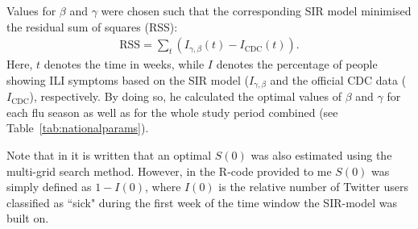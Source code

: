 \documentclass[11pt, a4paper,twoside]{report}\usepackage[]{graphicx}\usepackage[]{color}
\begin{document}
Values for $\beta$ and $\gamma$ were chosen such that the corresponding SIR model minimised the residual sum of squares (RSS):
  \begin{align}
\text{RSS} = \sum_{t}(I_{\gamma, \beta}(t)-I_{\text{CDC}}(t)). \label{eq:1}
  \end{align}
Here, $t$ denotes the time in weeks, while $I$ denotes the percentage of people showing ILI symptoms based on the SIR model ($I_{\gamma, \beta}$ and the official CDC data ($I_{\text{CDC}}$), respectively. By doing so, he calculated the optimal values of $\beta$ and $\gamma$ for each flu season as well as for the whole study period combined (see Table~\ref{tab:nationalparams}). 

Note that in \cite{bodnar_data_2015} it is written that an optimal $S(0)$ was also estimated using the multi-grid search method. However, in the R-code provided to me $S(0)$ was simply defined as $1-I(0)$, where $I(0)$ is the relative number of Twitter users classified as ``sick" during the first week of the time window the SIR-model was built on.
\end{document}
